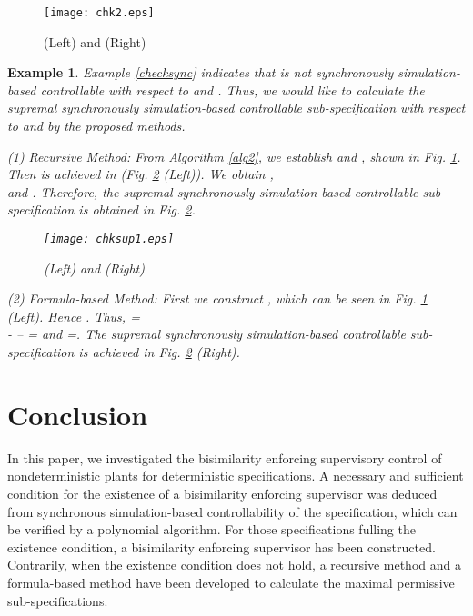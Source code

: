 \documentclass[preprint,authoryear,12pt]{elsarticle}
\newtheorem{Example}{Example}
\begin{document}
\begin{figure}[!htb]
\begin{center}
\texttt{[image: chk2.eps]}
\caption{  (Left) and  (Right)} \label{chk2}
\end{center}
\end{figure}




\begin{Example}\label{sub2}
Example \ref{checksync} indicates that  is not synchronously
simulation-based controllable with respect to  and
. Thus, we would like to calculate the supremal
synchronously simulation-based controllable sub-specification with
respect to  and  by the proposed methods.

(1) Recursive Method: From Algorithm \ref{alg2}, we establish
 and , shown in Fig. \ref{chk2}. Then
 is achieved in (Fig.
\ref{chksup} (Left)). We obtain ,
 \\ and . Therefore, the supremal synchronously
simulation-based controllable sub-specification
 is obtained in Fig. \ref{chksup}.


\begin{figure}[!htb]
\begin{center}
\texttt{[image: chksup1.eps]}
\caption{  (Left) and
 (Right)} \label{chksup}
\end{center}
\end{figure}

(2) Formula-based Method: First we construct , which
can be seen in Fig. \ref{chk2} (Left). Hence . Thus,
=\\-
--
= and =. The
supremal synchronously simulation-based controllable
sub-specification  is achieved in
Fig. \ref{chksup} (Right).
\end{Example}

\section{Conclusion}
In this paper, we investigated the bisimilarity enforcing
supervisory control of nondeterministic plants for deterministic
specifications. A necessary and sufficient condition for the
existence of a bisimilarity enforcing supervisor was deduced from
synchronous simulation-based controllability of the specification,
which can be verified by a polynomial algorithm. For those
specifications fulling the existence condition, a bisimilarity
enforcing supervisor has been constructed. Contrarily, when the
existence condition does not hold, a recursive method and a
formula-based method have been developed to calculate the maximal
permissive sub-specifications.












\end{document}
